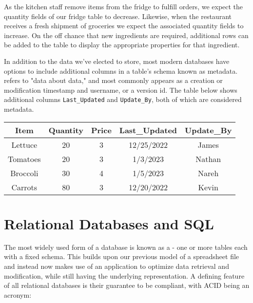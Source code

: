As the kitchen staff remove items from the fridge to fulfill orders, we expect the quantity fields of our fridge table to decrease. Likewise, when the restaurant receives a fresh shipment of groceries we expect the associated quantity fields to increase. On the off chance that new ingredients are required, additional rows can be added to the table to display the appropriate properties for that ingredient.

\begin{kaobox}[title=Getting Meta...]
    In addition to the data we've elected to store, most modern databases have options to include additional columns in a table's schema known as metadata.  refers to "data about data," and most commonly appears as a creation or modification timestamp and username, or a version id. The table below shows additional columns \texttt{Last\_Updated} and \texttt{Update\_By}, both of which are considered metadata.

    \begin{center}
        \begin{tabular}{ |c|c|c|c|c| } 
            \hline
            \textbf{Item} & \textbf{Quantity} & \textbf{Price} & \textbf{Last\_Updated} & \textbf{Update\_By} \\ 
            \hline
            Lettuce & 20 & 3 & 12/25/2022 & James \\ 
            \hline
            Tomatoes & 20 & 3 & 1/3/2023 & Nathan \\ 
            \hline
            Broccoli & 30 & 4 & 1/5/2023 & Nareh \\ 
            \hline
            Carrots & 80 & 3 & 12/20/2022 & Kevin \\ 
            \hline
        \end{tabular}
    \end{center}
\end{kaobox}


\section{Relational Databases and SQL}

The most widely used form of a database is known as a  - one or more tables each with a fixed schema. This builds upon our previous model of a spreadsheet file and instead now makes use of an application to optimize data retrieval and modification, while still having the underlying representation. A defining feature of all relational databases is their guarantee to be  compliant, with ACID being an acronym:

